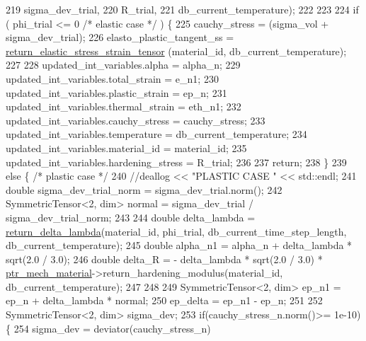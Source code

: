 \begin{DoxyCode}
219                                                  sigma\_dev\_trial,
220                                                  R\_trial,
221                                                  db\_current\_temperature);
222 
223 
224         \textcolor{keywordflow}{if} ( phi\_trial <= 0  \textcolor{comment}{/* elastic case */}   ) \{
225             cauchy\_stress = (sigma\_vol + sigma\_dev\_trial);
226             elasto\_plastic\_tangent\_ss = \hyperlink{classConstitutive__Laws_1_1Thermo__Elasto__Plastic_ae4b06b02caf03b89ed12254f8e7da816}{return\_elastic\_stress\_strain\_tensor}
      (material\_id, db\_current\_temperature);
227 
228             updated\_int\_variables.alpha = alpha\_n;
229             updated\_int\_variables.total\_strain = e\_n1;
230             updated\_int\_variables.plastic\_strain = ep\_n;
231             updated\_int\_variables.thermal\_strain = eth\_n1;
232             updated\_int\_variables.cauchy\_stress = cauchy\_stress;
233             updated\_int\_variables.temperature = db\_current\_temperature;
234             updated\_int\_variables.material\_id = material\_id;
235             updated\_int\_variables.hardening\_stress = R\_trial;
236 
237             \textcolor{keywordflow}{return};
238         \}
239         \textcolor{keywordflow}{else} \{ \textcolor{comment}{/* plastic case */}
240             \textcolor{comment}{//deallog << "PLASTIC CASE " << std::endl;}
241             \textcolor{keywordtype}{double} sigma\_dev\_trial\_norm = sigma\_dev\_trial.norm();
242             SymmetricTensor<2, dim> normal = sigma\_dev\_trial / sigma\_dev\_trial\_norm;
243 
244             \textcolor{keywordtype}{double} delta\_lambda = \hyperlink{classConstitutive__Laws_1_1Thermo__Elasto__Plastic_a807382a573b93d6c0f2c3aa14ad5b6ac}{return\_delta\_lambda}(material\_id, phi\_trial, 
      db\_current\_time\_step\_length, db\_current\_temperature);
245             \textcolor{keywordtype}{double} alpha\_n1 = alpha\_n + delta\_lambda * sqrt(2.0 / 3.0);
246             \textcolor{keywordtype}{double} delta\_R = - delta\_lambda * sqrt(2.0 / 3.0) * 
      \hyperlink{classConstitutive__Laws_1_1Thermo__Elasto__Plastic_a5a59fd71829d58859a122fe74628a9e4}{ptr\_mech\_material}->return\_hardening\_modulus(material\_id, db\_current\_temperature);
247 
248 
249             SymmetricTensor<2, dim> ep\_n1 = ep\_n + delta\_lambda * normal;
250             ep\_delta = ep\_n1 - ep\_n;
251 
252             SymmetricTensor<2, dim> sigma\_dev;
253             \textcolor{keywordflow}{if}(cauchy\_stress\_n.norm()>= 1e-10)\{
254                 sigma\_dev = deviator(cauchy\_stress\_n)

\end{DoxyCode}
